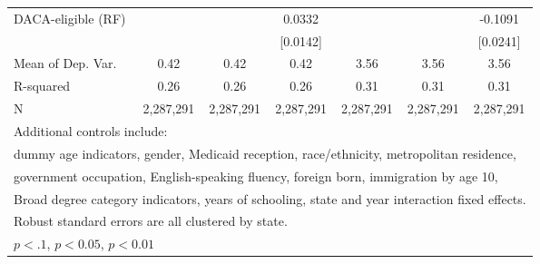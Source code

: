\begin{table}[htbp]
\begin{tabular}{l*{6}{c}}
\addlinespace
DACA-eligible (RF)  &                     &                     &      0.0332\sym{**} &                     &                     &     -0.1091\sym{***}\\
                    &                     &                     &    [0.0142]         &                     &                     &    [0.0241]         \\
\midrule
Mean of Dep. Var.   &        0.42         &        0.42         &        0.42         &        3.56         &        3.56         &        3.56         \\
R-squared           &        0.26         &        0.26         &        0.26         &        0.31         &        0.31         &        0.31         \\
N                   &   2,287,291         &   2,287,291         &   2,287,291         &   2,287,291         &   2,287,291         &   2,287,291         \\
\bottomrule
\multicolumn{7}{l}{\footnotesize Additional controls include:}\\
\multicolumn{7}{l}{\footnotesize dummy age indicators, gender, Medicaid reception, race/ethnicity, metropolitan residence,}\\
\multicolumn{7}{l}{\footnotesize government occupation, English-speaking fluency, foreign born, immigration by age 10,}\\
\multicolumn{7}{l}{\footnotesize Broad degree category indicators, years of schooling, state and year interaction fixed effects.}\\
\multicolumn{7}{l}{\footnotesize Robust standard errors are all clustered by state.}\\
\multicolumn{7}{l}{\footnotesize \sym{*} \(p<.1\), \sym{**} \(p<0.05\), \sym{***} \(p<0.01\)}\\
\end{tabular}
\end{table}
